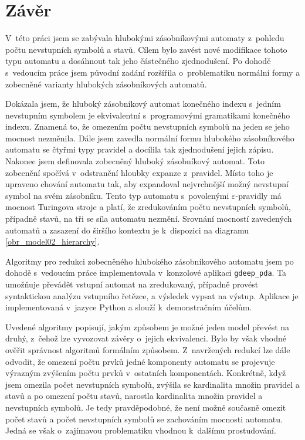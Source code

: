 \chapter{Závěr}


V~této práci jsem se zabývala hlubokými zásobníkovými automaty z~pohledu počtu nevstupních symbolů a stavů. Cílem bylo zavést nové modifikace tohoto typu automatu a dosáhnout tak jeho částečného zjednodušení. Po dohodě s~vedoucím práce jsem původní zadání rozšířila o~problematiku normální formy a zobecněné varianty hlubokých zásobníkových automatů.

Dokázala jsem, že hluboký zásobníkový automat konečného indexu s~jedním nevstupním symbolem je ekvivalentní s~programovými gramatikami konečného indexu. Znamená to, že omezením počtu nevstupních symbolů na jeden se jeho mocnost nezměnila.  Dále jsem zavedla normální formu hlubokého zásobníkového automatu se čtyřmi typy pravidel a docílila tak zjednodušení jejich zápisu. Nakonec jsem definovala zobecněný hluboký zásobníkový automat. Toto zobecnění spočívá v~odstranění hloubky expanze z~pravidel. Místo toho je upraveno chování automatu tak, aby expandoval nejvrchnější možný nevstupní symbol na svém zásobníku. Tento typ automatu s~povolenými $\varepsilon$-pravidly má mocnost Turingova stroje a platí, že zredukováním počtu nevstupních symbolů, případně stavů, na tři se síla automatu nezmění. Srovnání mocností zavedených automatů a zasazení do širšího kontextu je k~dispozici na diagramu \ref{obr_model02_hierarchy}.


Algoritmy pro redukci zobecněného hlubokého zásobníkového automatu jsem po dohodě s~vedoucím práce implementovala v~konzolové aplikaci \texttt{gdeep\_pda}. Ta umožňuje převádět vstupní automat na zredukovaný, případně provést syntaktickou analýzu vstupního řetězce, a výsledek vypsat na výstup. Aplikace je implementovaná v~jazyce Python a slouží k~demonstračním účelům. 

Uvedené algoritmy popisují, jakým způsobem je možné jeden model převést na druhý, z~čehož lze vyvozovat závěry o~jejich ekvivalenci. Bylo by však vhodné ověřit správnost algoritmů formálním způsobem. Z~navržených redukcí lze dále odvodit, že omezení počtu prvků jedné komponenty automatu se projevuje výrazným zvýšením počtu prvků v~ostatních komponentách. Konkrétně, když jsem omezila počet nevstupních symbolů, zvýšila se kardinalita množin pravidel a stavů a po omezení počtu stavů, narostla kardinalita množin pravidel a nevstupních symbolů. Je tedy pravděpodobné, že není možné současně omezit počet stavů a počet nevstupních symbolů se zachováním mocnosti automatu. Jedná se však o~zajímavou problematiku vhodnou k~dalšímu prostudování.




